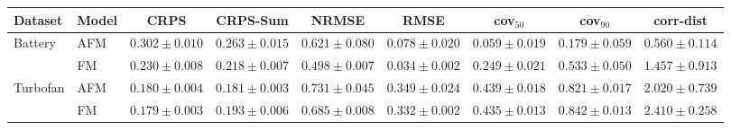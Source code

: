 \begin{tabular}{llccccccc}
\toprule
Dataset & Model & CRPS & CRPS-Sum & NRMSE & RMSE & cov$_{50}$ & cov$_{90}$ & corr-dist \\
\midrule
Battery & AFM & $0.302\!\pm\!0.010$ & $0.263\!\pm\!0.015$ & $0.621\!\pm\!0.080$ & $0.078\!\pm\!0.020$ & $0.059\!\pm\!0.019$ & $0.179\!\pm\!0.059$ & $0.560\!\pm\!0.114$ \\
 & FM & $0.230\!\pm\!0.008$ & $0.218\!\pm\!0.007$ & $0.498\!\pm\!0.007$ & $0.034\!\pm\!0.002$ & $0.249\!\pm\!0.021$ & $0.533\!\pm\!0.050$ & $1.457\!\pm\!0.913$ \\
\midrule
Turbofan & AFM & $0.180\!\pm\!0.004$ & $0.181\!\pm\!0.003$ & $0.731\!\pm\!0.045$ & $0.349\!\pm\!0.024$ & $0.439\!\pm\!0.018$ & $0.821\!\pm\!0.017$ & $2.020\!\pm\!0.739$ \\
 & FM & $0.179\!\pm\!0.003$ & $0.193\!\pm\!0.006$ & $0.685\!\pm\!0.008$ & $0.332\!\pm\!0.002$ & $0.435\!\pm\!0.013$ & $0.842\!\pm\!0.013$ & $2.410\!\pm\!0.258$ \\
\bottomrule
\end{tabular}